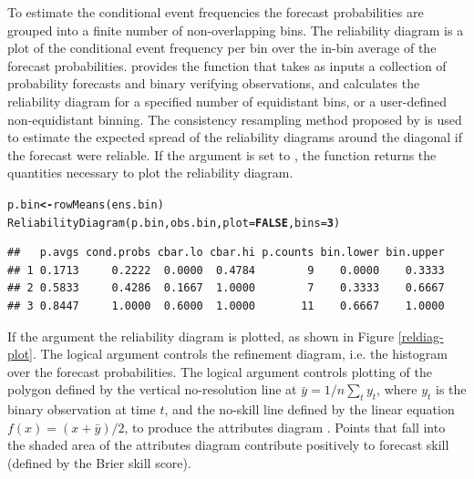 \documentclass[article]{jss}\usepackage[]{graphicx}\usepackage[]{color}
\makeatletter
\newcommand{\hlnum}[1]{\textcolor[rgb]{0.502,0,0.502}{\textbf{#1}}}%
\newcommand{\hlstd}[1]{\textcolor[rgb]{0,0,0}{#1}}%
\newcommand{\hlkwb}[1]{\textcolor[rgb]{0.502,0.502,0.753}{\textbf{#1}}}%
\newcommand{\hlkwc}[1]{\textcolor[rgb]{0,0.502,0.753}{#1}}%
\newcommand{\hlkwd}[1]{\textcolor[rgb]{0,0.267,0.4}{#1}}%
\newenvironment{kframe}{%
 \def\at@end@of@kframe{}%
 \ifinner\ifhmode%
  \def\at@end@of@kframe{\end{minipage}}%
  \begin{minipage}{\columnwidth}%
 \fi\fi%
 \def\FrameCommand##1{\hskip\@totalleftmargin \hskip-\fboxsep
 \colorbox{shadecolor}{##1}\hskip-\fboxsep
     \hskip-\linewidth \hskip-\@totalleftmargin \hskip\columnwidth}%
 \MakeFramed {\advance\hsize-\width
   \@totalleftmargin\z@ \linewidth\hsize
   \@setminipage}}%
 {\par\unskip\endMakeFramed%
 \at@end@of@kframe}
\newenvironment{knitrout}{}{} %
\makeatother
\begin{document}
To estimate the conditional event frequencies the forecast probabilities are grouped into a finite number of non-overlapping bins.
The reliability diagram is a plot of the conditional event frequency per bin over the in-bin average of the forecast probabilities.
 provides the function  that takes as inputs a collection of probability forecasts and binary verifying observations, and calculates the reliability diagram for a specified number of equidistant bins, or a user-defined non-equidistant binning.
The consistency resampling method proposed by \citet{broecker2007increasing} is used to estimate the expected spread of the reliability diagrams around the diagonal if the forecast were reliable.
If the  argument is set to , the  function returns the quantities necessary to plot the reliability diagram.
%
\begin{knitrout}
\color{fgcolor}\begin{kframe}
\begin{alltt}
\hlstd{p.bin} \hlkwb{<-} \hlkwd{rowMeans}\hlstd{(ens.bin)}
\hlkwd{ReliabilityDiagram}\hlstd{(p.bin, obs.bin,} \hlkwc{plot}\hlstd{=}\hlnum{FALSE}\hlstd{,} \hlkwc{bins}\hlstd{=}\hlnum{3}\hlstd{)}
\end{alltt}
\begin{verbatim}
##   p.avgs cond.probs cbar.lo cbar.hi p.counts bin.lower bin.upper
## 1 0.1713     0.2222  0.0000  0.4784        9    0.0000    0.3333
## 2 0.5833     0.4286  0.1667  1.0000        7    0.3333    0.6667
## 3 0.8447     1.0000  0.6000  1.0000       11    0.6667    1.0000
\end{verbatim}
\end{kframe}
\end{knitrout}
%
If the argument  the reliability diagram is plotted, as shown in Figure \ref{reldiag-plot}. 
The logical argument  controls the refinement diagram, i.e. the histogram over the forecast probabilities.
The logical argument  controls plotting of the polygon defined by the vertical no-resolution line at $\bar{y} = 1/n \sum_t y_t$, where $y_t$ is the binary observation at time $t$, and the no-skill line defined by the linear equation $f(x)=(x+\bar{y})/2$, to produce the attributes diagram \citep{hsu1986attributes}.
Points that fall into the shaded area of the attributes diagram contribute positively to forecast skill (defined by the Brier skill score).
\end{document}
